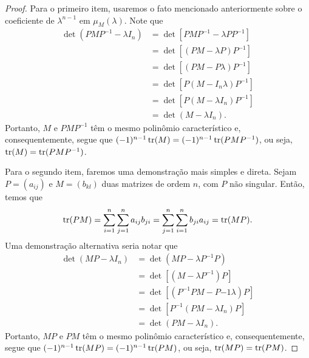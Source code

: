 	\begin{proof}
		Para o primeiro item, usaremos o fato mencionado anteriormente sobre o 
		coeficiente de $\lambda^{n-1}$ em $\mu_M(\lambda)$. Note que 
		\begin{align*}
    		\det( PMP^{-1} - \lambda I_n ) &= \det[ PMP^{-1} - \lambda PP^{-1} ] \\
    		&= \det[ (PM - \lambda P)P^{-1} ] \\
    		&= \det[ (PM - P\lambda)P^{-1} ] \\
    		&= \det[ P(M - I_n\lambda)P^{-1} ] \\
    		&= \det[ P(M - \lambda I_n)P^{-1} ] \\
    		&= \det(M - \lambda I_n).
		\end{align*}
		Portanto, $M$ e $PMP^{-1}$ têm o mesmo polinômio característico e, consequentemente, 
		segue que $(-1)^{n-1}\operatorname{tr}(M) = (-1)^{n-1}\operatorname{tr}(PMP^{-1})$, ou seja, $\operatorname{tr}(M) = \operatorname{tr}(PMP^{-1})$.
		
		\par\vspace{0.3cm} Para o segundo item, faremos uma demonstração mais simples e direta. 
		Sejam $P = (a_{ij})$ e $M = (b_{kl})$ duas matrizes de ordem $n$, com $P$ não singular. 
		Então, temos que
		\begin{align*}
		    \operatorname{tr}(PM) 
		    = \sum_{i=1}^{n}\sum_{j=1}^{n} a_{ij}b_{ji} 
		    = \sum_{j=1}^{n}\sum_{i=1}^{n} b_{ji}a_{ij} 
		    = \operatorname{tr}(MP).
		\end{align*}
		Uma demonstração alternativa seria notar que
		\begin{align*}
    		\det(MP - \lambda I_n) &= \det(MP - \lambda P^{-1}P) \\
    		&= \det[ (M - \lambda P^{-1})P ] \\
    		&= \det[ (P^{-1}PM - P{-1}\lambda)P ] \\
    		&= \det[ P^{-1}(PM - \lambda I_n)P ] \\
    		&= \det(PM - \lambda I_n).
		\end{align*}
		Portanto, $MP$ e $PM$ têm o mesmo polinômio característico e, consequentemente, 
		segue que $(-1)^{n-1}\operatorname{tr}(MP) = (-1)^{n-1}\operatorname{tr}(PM)$, ou seja, $\operatorname{tr}(MP) = \operatorname{tr}(PM)$.
	\end{proof}
